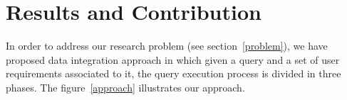 


\section{Results and Contribution}

In order to address our research problem (see section~\ref{problem}), we have proposed data integration approach in which given a query and a set of user requirements associated to it, the query execution process is divided in three phases. The figure~\ref{approach} illustrates our approach.


	

